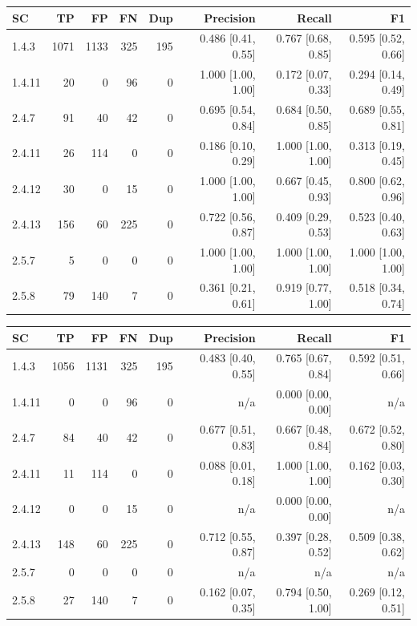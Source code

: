 \begin{tabular}{lrrrrrrr}
\hline
SC & TP & FP & FN & Dup & Precision & Recall & F1 \\
\hline
1.4.3 & 1071 & 1133 & 325 & 195 & 0.486 [0.41, 0.55] & 0.767 [0.68, 0.85] & 0.595 [0.52, 0.66] \\
1.4.11 & 20 & 0 & 96 & 0 & 1.000 [1.00, 1.00] & 0.172 [0.07, 0.33] & 0.294 [0.14, 0.49] \\
2.4.7 & 91 & 40 & 42 & 0 & 0.695 [0.54, 0.84] & 0.684 [0.50, 0.85] & 0.689 [0.55, 0.81] \\
2.4.11 & 26 & 114 & 0 & 0 & 0.186 [0.10, 0.29] & 1.000 [1.00, 1.00] & 0.313 [0.19, 0.45] \\
2.4.12 & 30 & 0 & 15 & 0 & 1.000 [1.00, 1.00] & 0.667 [0.45, 0.93] & 0.800 [0.62, 0.96] \\
2.4.13 & 156 & 60 & 225 & 0 & 0.722 [0.56, 0.87] & 0.409 [0.29, 0.53] & 0.523 [0.40, 0.63] \\
2.5.7 & 5 & 0 & 0 & 0 & 1.000 [1.00, 1.00] & 1.000 [1.00, 1.00] & 1.000 [1.00, 1.00] \\
2.5.8 & 79 & 140 & 7 & 0 & 0.361 [0.21, 0.61] & 0.919 [0.77, 1.00] & 0.518 [0.34, 0.74] \\
\hline
\end{tabular}

\begin{tabular}{lrrrrrrr}
\hline
SC & TP & FP & FN & Dup & Precision & Recall & F1 \\
\hline
1.4.3 & 1056 & 1131 & 325 & 195 & 0.483 [0.40, 0.55] & 0.765 [0.67, 0.84] & 0.592 [0.51, 0.66] \\
1.4.11 & 0 & 0 & 96 & 0 & n/a & 0.000 [0.00, 0.00] & n/a \\
2.4.7 & 84 & 40 & 42 & 0 & 0.677 [0.51, 0.83] & 0.667 [0.48, 0.84] & 0.672 [0.52, 0.80] \\
2.4.11 & 11 & 114 & 0 & 0 & 0.088 [0.01, 0.18] & 1.000 [1.00, 1.00] & 0.162 [0.03, 0.30] \\
2.4.12 & 0 & 0 & 15 & 0 & n/a & 0.000 [0.00, 0.00] & n/a \\
2.4.13 & 148 & 60 & 225 & 0 & 0.712 [0.55, 0.87] & 0.397 [0.28, 0.52] & 0.509 [0.38, 0.62] \\
2.5.7 & 0 & 0 & 0 & 0 & n/a & n/a & n/a \\
2.5.8 & 27 & 140 & 7 & 0 & 0.162 [0.07, 0.35] & 0.794 [0.50, 1.00] & 0.269 [0.12, 0.51] \\
\hline
\end{tabular}


